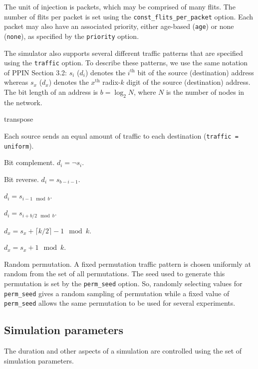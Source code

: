 \documentclass[11pt]{article}
\begin{document}
The unit of injection is packets, which may be comprised of many
flits.  The number of flits per packet is set using the
\texttt{const\_flits\_per\_packet} option.  Each packet may also have an
associated priority, either age-based (\texttt{age}) or none
(\texttt{none}), as specified by the \texttt{priority} option.

The simulator also supports several different traffic patterns that
are specified using the \texttt{traffic} option.  To describe these
patterns, we use the same notation of PPIN Section 3.2: $s_i$ ($d_i$)
denotes the $i^\textrm{th}$ bit of the source (destination) address
whereas $s_x$ ($d_x$) denotes the $x^\textrm{th}$ radix-$k$ digit of
the source (destination) address.  The bit length of an address is $b
= \log_2 N$, where $N$ is the number of nodes in the network.

\begin{opt_list}{transpose}
\item[uniform] Each source sends an equal amount of traffic to each
destination (\texttt{traffic = uniform}).
\item[bitcomp] Bit complement. $d_i = \neg s_i$.
\item[bitrev] Bit reverse. $d_i = s_{b-i-1}$.
\item[shuffle] $d_i = s_{i-1 \mod b}$.
\item[transpose] $d_i = s_{i+b/2 \mod b}$.
\item[tornado] $d_x = s_x + \lceil k/2 \rceil - 1 \mod k$.
\item[neighbor] $d_x = s_x + 1 \mod k$.
\item[randperm] Random permutation.  A fixed permutation traffic
pattern is chosen uniformly at random from the set of all
permutations.  The seed used to generate this permutation is set by
the \texttt{perm\_seed} option.  So, randomly selecting values for
\texttt{perm\_seed} gives a random sampling of permutation while a
fixed value of \texttt{perm\_seed} allows the same permutation to be
used for several experiments.
\end{opt_list}

\subsection{Simulation parameters}
\label{sec:sim_params}

The duration and other aspects of a simulation are controlled using
the set of simulation parameters.
\end{document}
